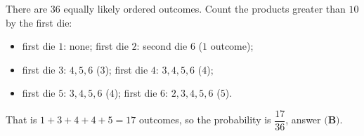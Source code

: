 There are $36$ equally likely ordered outcomes. Count the products greater than $10$ by the first die:
\begin{itemize}
\item first die $1$: none; first die $2$: second die $6$ ($1$ outcome);
\item first die $3$: $4,5,6$ ($3$); first die $4$: $3,4,5,6$ ($4$);
\item first die $5$: $3,4,5,6$ ($4$); first die $6$: $2,3,4,5,6$ ($5$).
\end{itemize}
That is $1+3+4+4+5=17$ outcomes, so the probability is $\dfrac{17}{36}$, answer $\boxed{\textbf{(B)}}$.
